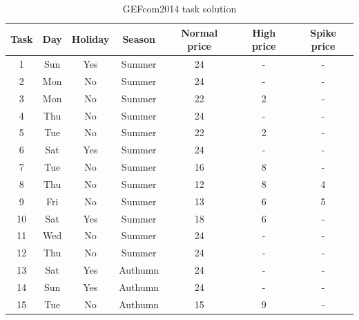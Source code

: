 \documentclass[review]{elsarticle}
\begin{document}
    \begin{table}[htbp]
      \caption{GEFcom2014 task solution}
      \begin{center}
      \begin{tabular}{|c|c|c|c|c|c|c|}
      \hline
      Task & Day & Holiday & Season & Normal price & High price & Spike price\\
      \hline
      1 & Sun & Yes & Summer & 24 & - & -\\
      2 & Mon & No & Summer & 24 & - & -\\
      3 & Mon & No & Summer & 22 & 2 & -\\
      4 & Thu & No & Summer & 24 & - & -\\
      5 & Tue & No & Summer & 22 & 2 & -\\
      6 & Sat & Yes & Summer & 24 & - & -\\
      7 & Tue & No & Summer & 16 & 8 & -\\
      8 & Thu & No & Summer & 12 & 8 & 4\\
      9 & Fri & No & Summer & 13 & 6 & 5\\
      10 & Sat & Yes & Summer & 18 & 6 & -\\
      11 & Wed & No & Summer & 24 & - & -\\
      12 & Thu & No & Summer & 24 & - & -\\
      13 & Sat & Yes & Authumn & 24 & - & -\\
      14 & Sun & Yes & Authumn & 24 & - & -\\
      15 & Tue & No & Authumn & 15 & 9 & -\\
      \hline
      \end{tabular}
      \label{table:price_data_set}
      \end{center}
    \end{table}
\end{document}
